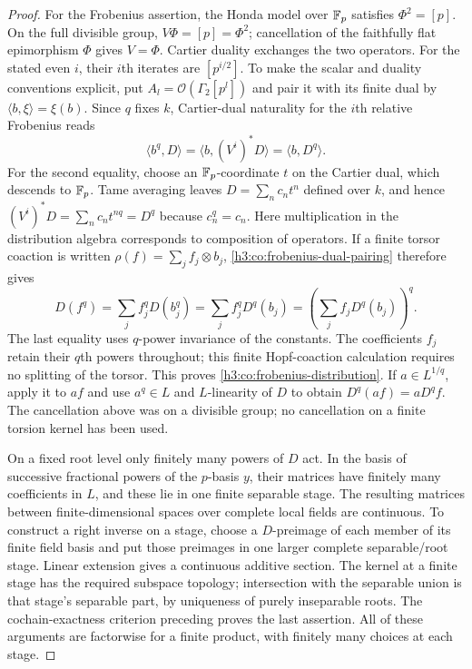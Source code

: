 \begin{proof}
For the Frobenius assertion, the Honda model over $\mathbb F_p$ satisfies
$\Phi^2=[p]$.  On the full divisible group,
$V\Phi=[p]=\Phi^2$; cancellation of the faithfully flat epimorphism
$\Phi$ gives $V=\Phi$.  Cartier duality exchanges the two operators.
For the stated even $i$, their $i$th iterates are $[p^{i/2}]$.
To make the scalar and duality conventions explicit, put
$A_l=\mathcal O(\Gamma_2[p^l])$ and pair it with its finite dual by
$\langle b,\xi\rangle=\xi(b)$.  Since $q$ fixes $k$, Cartier-dual
naturality for the $i$th relative Frobenius reads
\begin{equation}\label{h3:co:frobenius-dual-pairing}
 \langle b^q,D\rangle
   =\langle b,(V^i)^*D\rangle
   =\langle b,D^q\rangle.
\end{equation}
For the second equality, choose an $\mathbb F_p$-coordinate $t$ on the Cartier dual,
which descends to $\mathbb F_p$.  Tame averaging leaves $D=\sum_n c_nt^n$ defined over
$k$, and hence
$(V^i)^*D=\sum_n c_nt^{nq}=D^q$ because $c_n^q=c_n$.
Here multiplication in the distribution algebra corresponds to
composition of operators.  If a finite torsor coaction is written
$\rho(f)=\sum_j f_j\otimes b_j$, \eqref{h3:co:frobenius-dual-pairing}
therefore gives
\[
 D(f^q)=\sum_j f_j^qD(b_j^q)
       =\sum_j f_j^qD^q(b_j)
       =\left(\sum_j f_jD^q(b_j)\right)^q.
\]
The last equality uses $q$-power invariance of the constants.
The coefficients $f_j$ retain their $q$th powers throughout; this finite
Hopf-coaction calculation requires no splitting of the torsor.
This proves \eqref{h3:co:frobenius-distribution}.  If $a\in L^{1/q}$,
apply it to $af$ and use $a^q\in L$ and $L$-linearity of $D$ to obtain
$D^q(af)=aD^qf$.  The cancellation above was on a divisible group;
no cancellation on a finite torsion kernel has been used.

On a fixed root level only finitely many powers of $D$ act.  In the
basis of successive fractional powers of the $p$-basis $y$, their
matrices have finitely many coefficients in $L$, and these lie in one
finite separable stage.  The resulting matrices between finite-dimensional
spaces over complete local fields are continuous.  To construct a
right inverse on a stage, choose a $D$-preimage of each member of its
finite field basis and put those preimages in one larger complete
separable/root stage.  Linear extension gives a continuous additive
section.  The kernel at a finite stage has the required subspace
topology; intersection with the separable union is that stage's
separable part, by uniqueness of purely inseparable roots.  The
cochain-exactness criterion preceding  proves the
last assertion.  All of these arguments are factorwise for a finite
product, with finitely many choices at each stage.
\end{proof}

